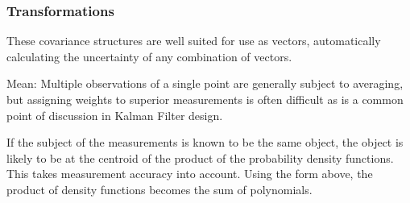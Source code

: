 \documentclass[a4paper, 11pt, titlepage]{article}
\begin{document}
    \subsubsection{Transformations}
      These covariance structures are well suited for use as vectors, automatically calculating the uncertainty of any combination of vectors.
      
      Mean:
      Multiple observations of a single point are generally subject to averaging, but assigning weights to superior measurements is often difficult as is a common point of discussion in Kalman Filter design.
      
      If the subject of the measurements is known to be the same object, the object is likely to be at the centroid of the product of the probability density functions.  This takes measurement accuracy into account.
      Using the form above, the product of density functions becomes the sum of polynomials.
\end{document}
